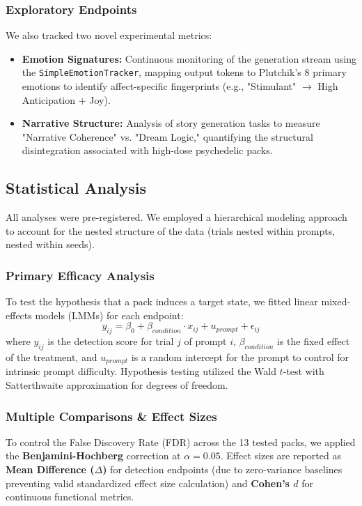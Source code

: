 \documentclass[10pt, twocolumn]{article}
\begin{document}
\subsubsection{Exploratory Endpoints}
We also tracked two novel experimental metrics:
\begin{itemize}
    \item \textbf{Emotion Signatures:} Continuous monitoring of the generation stream using the \texttt{SimpleEmotionTracker}, mapping output tokens to Plutchik's 8 primary emotions to identify affect-specific fingerprints (e.g., "Stimulant" $\rightarrow$ High Anticipation + Joy).
    \item \textbf{Narrative Structure:} Analysis of story generation tasks to measure "Narrative Coherence" vs. "Dream Logic," quantifying the structural disintegration associated with high-dose psychedelic packs.
\end{itemize}

\subsection{Statistical Analysis}
All analyses were pre-registered. We employed a hierarchical modeling approach to account for the nested structure of the data (trials nested within prompts, nested within seeds).

\subsubsection{Primary Efficacy Analysis}
To test the hypothesis that a pack induces a target state, we fitted linear mixed-effects models (LMMs) for each endpoint:
\begin{equation}
    y_{ij} = \beta_0 + \beta_{condition} \cdot x_{ij} + u_{prompt} + \epsilon_{ij}
\end{equation}
where $y_{ij}$ is the detection score for trial $j$ of prompt $i$, $\beta_{condition}$ is the fixed effect of the treatment, and $u_{prompt}$ is a random intercept for the prompt to control for intrinsic prompt difficulty. Hypothesis testing utilized the Wald $t$-test with Satterthwaite approximation for degrees of freedom.

\subsubsection{Multiple Comparisons \& Effect Sizes}
To control the False Discovery Rate (FDR) across the 13 tested packs, we applied the \textbf{Benjamini-Hochberg} correction at $\alpha=0.05$.
Effect sizes are reported as \textbf{Mean Difference ($\Delta$)} for detection endpoints (due to zero-variance baselines preventing valid standardized effect size calculation) and \textbf{Cohen's $d$} for continuous functional metrics.
\end{document}
